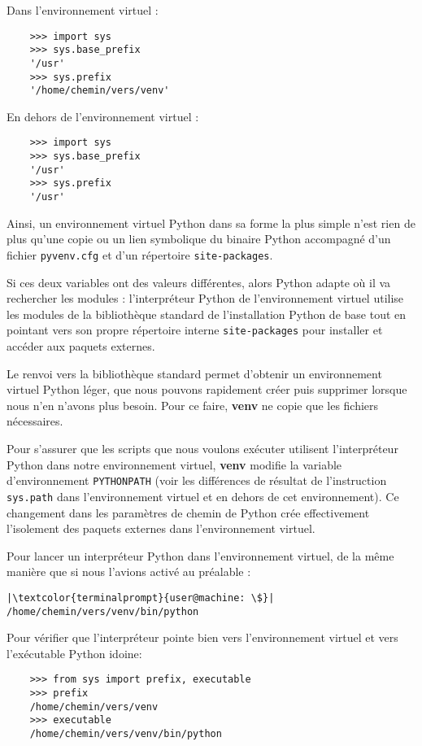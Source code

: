 Dans l'environnement virtuel :
\begin{verbatim}
    >>> import sys
    >>> sys.base_prefix
    '/usr'
    >>> sys.prefix
    '/home/chemin/vers/venv'
\end{verbatim}

En dehors de l'environnement virtuel :
\begin{verbatim}
    >>> import sys
    >>> sys.base_prefix
    '/usr'
    >>> sys.prefix
    '/usr'
\end{verbatim}

Ainsi, un environnement virtuel Python dans sa forme la plus simple n'est rien de plus qu’une copie ou un lien symbolique du binaire Python accompagné d’un fichier \texttt{pyvenv.cfg} et d’un répertoire \texttt{site-packages}. 

Si ces deux variables ont des valeurs différentes, alors Python adapte où il va rechercher les modules : l’interpréteur Python de l'environnement virtuel utilise les modules de la bibliothèque standard de l'installation Python de base tout en pointant vers son propre répertoire interne \texttt{site-packages} pour installer et accéder aux paquets externes.

Le renvoi vers la bibliothèque standard permet d'obtenir un environnement virtuel Python léger, que nous pouvons rapidement créer puis supprimer lorsque nous n’en n'avons plus besoin. Pour ce faire, \textbf{venv} ne copie que les fichiers nécessaires.

Pour s’assurer que les scripts que nous voulons exécuter utilisent l’interpréteur Python dans notre environnement virtuel, \textbf{venv} modifie la variable d’environnement \texttt{PYTHONPATH} (voir les différences de résultat de l'instruction \texttt{sys.path} dans l'environnement virtuel et en dehors de cet environnement). Ce changement dans les paramètres de chemin de Python crée effectivement l’isolement des paquets externes dans l'environnement virtuel.

Pour lancer un interpréteur Python dans l'environnement virtuel, de la même manière que si nous l'avions activé au préalable :
\begin{lstlisting}[style=terminal]
|\textcolor{terminalprompt}{user@machine: \$}| /home/chemin/vers/venv/bin/python
\end{lstlisting}

Pour vérifier que l'interpréteur pointe bien vers l'environnement virtuel  et vers l'exécutable Python idoine:
\begin{verbatim}
    >>> from sys import prefix, executable
    >>> prefix
    /home/chemin/vers/venv
    >>> executable
    /home/chemin/vers/venv/bin/python
\end{verbatim}


